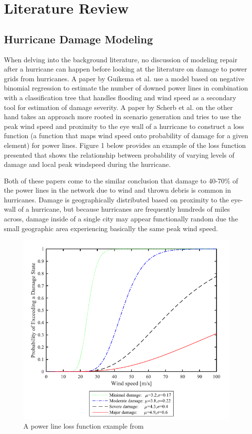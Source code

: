 \documentclass{article}
\begin{document}
	
	\section{Literature Review}
	\subsection{Hurricane Damage Modeling}
		When delving into the background literature, no discussion of modeling repair after a hurricane can happen before looking at the literature on damage to power grids from hurricanes. A paper by Guikema et al. \cite{GuikemaEA2010} use a model based on negative binomial regression to estimate the number of downed power lines in combination with a classification tree that handles flooding and wind speed as a secondary tool for estimation of damage severity. A paper by Scherb et al. \cite{ScherbEA2015} on the other hand takes an approach more rooted in scenario generation and tries to use the peak wind speed and proximity to the eye wall of a hurricane to construct a loss function (a function that maps wind speed onto probability of damage for a given element) for power lines. Figure 1 below provides an example of the loss function presented that shows the relationship between probability of varying levels of damage and local peak windspeed during the hurricane.
		
		 Both of these papers come to the similar conclusion that damage to 40-70\% of the power lines in the network due to wind and thrown debris is common in hurricanes. Damage is geographically distributed based on proximity to the eye-wall of a hurricane, but because hurricanes are frequently hundreds of miles across, damage inside of a single city may appear functionally random due the small geographic area experiencing basically the same peak wind speed. 
		
			\begin{figure}[htbp]
			\centering
			\includegraphics[width=.5\linewidth]{ScherbFigure.PNG}
			\caption{A power line loss function example from \cite{ScherbEA2015}}
		\end{figure}
		
\end{document}
